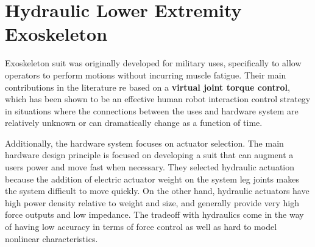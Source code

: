 



% 
\section{Hydraulic Lower Extremity Exoskeleton}

Exoskeleton suit was originally developed for military uses, specifically to allow operators to perform motions without incurring muscle fatigue.  Their main contributions in the literature re based on a {\bf virtual joint torque control}, which has been shown to be an effective human robot interaction control strategy in situations where the connections between the uses and hardware system are relatively unknown or can dramatically change as a function of time.

Additionally, the hardware system focuses on actuator selection.  The main hardware design principle is focused on developing a suit that can augment a users power and move fast when necessary.  They selected hydraulic actuation because the addition of electric actuator weight on the system leg joints makes the system difficult to move quickly.  On the other hand, hydraulic actuators have high power density relative to weight and size, and generally provide very high force outputs and low impedance.  The tradeoff with hydraulics come in the way of having low accuracy in terms of force control as well as hard to model nonlinear characteristics.  

